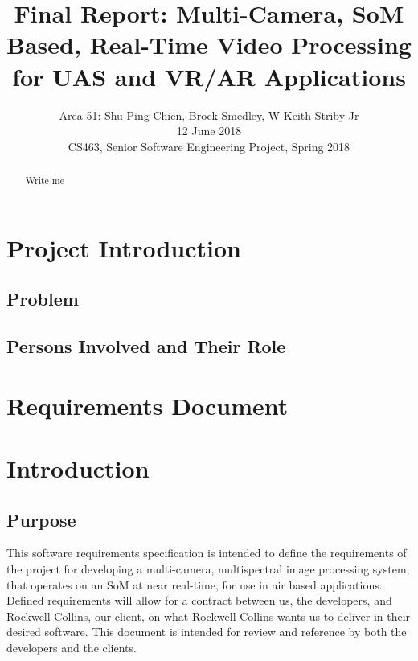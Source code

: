 \documentclass[letterpaper,10pt,serif,draftclsnofoot,onecolumn,compsoc,titlepage]{IEEEtran}
\title{Final Report: Multi-Camera, SoM Based, Real-Time Video Processing for UAS and VR/AR Applications}
\author{Area 51: Shu-Ping Chien, Brock Smedley, W Keith Striby Jr \\ 12 June 2018 \\ CS463, Senior Software Engineering Project, Spring 2018}
\begin{document}
\begin{titlepage}
\maketitle

\begin{abstract}

Write me \\


\thispagestyle{empty}
\end{abstract}
\end{titlepage}

\newpage
\tableofcontents

\newpage

\section{Project Introduction}

\subsection{Problem}

\subsection{Persons Involved and Their Role}

\newpage 

\section{Requirements Document}

\section{Introduction}

\subsection{Purpose}

This software requirements specification is intended to define the requirements of the 
project for developing a multi-camera, multispectral image processing system, that 
operates on an SoM at near real-time, for use in air based 
applications. Defined requirements will allow for a contract between us, the 
developers, and Rockwell Collins, our client, on what Rockwell Collins wants us to 
deliver in their desired software. This document is intended for review and reference 
by both the developers and the clients.\\
\end{document}
